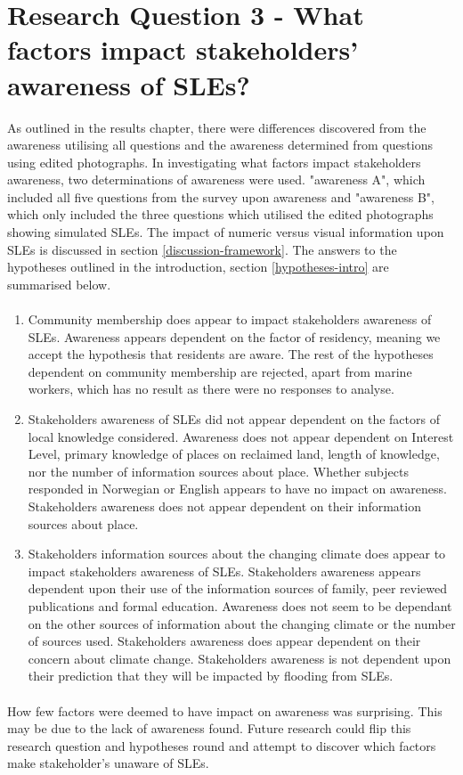 \paragraph{}

\section{Research Question 3 - What factors impact stakeholders' awareness of SLEs? } \label{RQ3 - finding}
 As outlined in the results chapter, there were differences discovered from the awareness utilising all questions and the awareness determined from questions using edited photographs. In investigating what factors impact stakeholders awareness, two determinations of awareness were used. "awareness A", which included all five questions from the survey upon awareness and "awareness B", which only included the three questions which utilised the edited photographs showing simulated SLEs. The impact of numeric versus visual information upon SLEs is discussed in section \ref{discussion-framework}. The answers to the hypotheses outlined in the introduction, section \ref{hypotheses-intro} are summarised below. 
 \paragraph{}
 
\begin{enumerate}
    \item Community membership does appear to impact stakeholders awareness of SLEs. Awareness appears dependent on the factor of residency, meaning we accept the hypothesis that residents are aware. The rest of the hypotheses dependent on community membership are rejected, apart from marine workers, which has no result as there were no responses to analyse.
  
    \item Stakeholders awareness of SLEs did not appear dependent on the factors of local knowledge considered. Awareness does not appear dependent on Interest Level, primary knowledge of places on reclaimed land, length of knowledge, nor the number of information sources about place. Whether subjects responded in Norwegian or English appears to have no impact on awareness. Stakeholders awareness does not appear dependent on their information sources about place. 

    \item  Stakeholders information sources about the changing climate does appear to impact stakeholders awareness of SLEs. Stakeholders awareness appears dependent upon their use of the information sources of family, peer reviewed publications and formal education. Awareness does not seem to be dependant on the other sources of information about the changing climate or the number of sources used. Stakeholders awareness does appear dependent on their concern about climate change. Stakeholders awareness is not dependent upon their prediction that they will be impacted by flooding from SLEs.
\end{enumerate}
\paragraph{}
How few factors were deemed to have impact on awareness was surprising. This may be due to the lack of awareness found.  Future research could flip this research question and hypotheses round and attempt to discover which factors make stakeholder's unaware of SLEs. 


